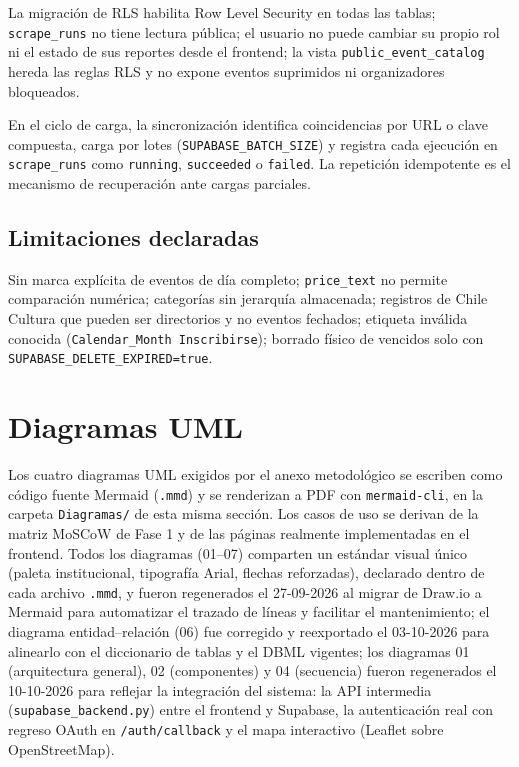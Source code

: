 La migración de RLS habilita Row Level Security en todas las tablas; \texttt{scrape\_runs}
no tiene lectura pública; el usuario no puede cambiar su propio rol ni el estado de sus
reportes desde el frontend; la vista \texttt{public\_event\_catalog} hereda las reglas RLS y
no expone eventos suprimidos ni organizadores bloqueados.

En el ciclo de carga, la sincronización identifica coincidencias por URL o clave compuesta,
carga por lotes (\texttt{SUPABASE\_BATCH\_SIZE}) y registra cada ejecución en
\texttt{scrape\_runs} como \texttt{running}, \texttt{succeeded} o \texttt{failed}. La
repetición idempotente es el mecanismo de recuperación ante cargas parciales.

\subsection{Limitaciones declaradas}

Sin marca explícita de eventos de día completo; \texttt{price\_text} no permite comparación
numérica; categorías sin jerarquía almacenada; registros de Chile Cultura que pueden ser
directorios y no eventos fechados; etiqueta inválida conocida (\texttt{Calendar\_Month
Inscribirse}); borrado físico de vencidos solo con
\texttt{SUPABASE\_DELETE\_EXPIRED=true}.

\section{Diagramas UML}
\label{sec:uml}

Los cuatro diagramas UML exigidos por el anexo metodológico se escriben como código fuente
Mermaid (\texttt{.mmd}) y se renderizan a PDF con \texttt{mermaid-cli}, en la carpeta
\texttt{Diagramas/} de esta misma sección. Los casos de uso se derivan de la matriz MoSCoW de
Fase 1 y de las páginas realmente implementadas en el frontend. Todos los diagramas (01--07)
comparten un estándar visual único (paleta institucional, tipografía Arial, flechas
reforzadas), declarado dentro de cada archivo \texttt{.mmd}, y fueron regenerados el
27-09-2026 al migrar de Draw.io a Mermaid para automatizar el trazado de líneas y facilitar
el mantenimiento; el diagrama entidad--relación (06) fue corregido y reexportado el
03-10-2026 para alinearlo con el diccionario de tablas y el DBML vigentes; los
diagramas 01 (arquitectura general), 02 (componentes) y 04 (secuencia) fueron
regenerados el 10-10-2026 para reflejar la integración del sistema: la API
intermedia (\texttt{supabase\_backend.py}) entre el frontend y Supabase, la
autenticación real con regreso OAuth en \texttt{/auth/callback} y el mapa
interactivo (Leaflet sobre OpenStreetMap).

